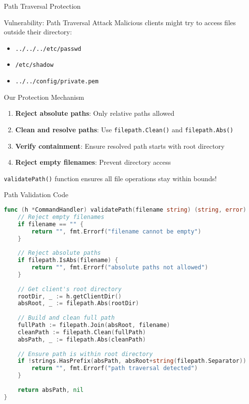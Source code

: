 \documentclass[aspectratio=169]{beamer}
\begin{document}
\begin{frame}{Path Traversal Protection}
\begin{block}{Vulnerability: Path Traversal Attack}
Malicious clients might try to access files outside their directory:
\begin{itemize}
    \item \texttt{../../../etc/passwd}
    \item \texttt{/etc/shadow}
    \item \texttt{../../config/private.pem}
\end{itemize}
\end{block}

\vspace{0.3cm}

\begin{exampleblock}{Our Protection Mechanism}
\begin{enumerate}
    \item \textbf{Reject absolute paths}: Only relative paths allowed
    \item \textbf{Clean and resolve paths}: Use \texttt{filepath.Clean()} and \texttt{filepath.Abs()}
    \item \textbf{Verify containment}: Ensure resolved path starts with root directory
    \item \textbf{Reject empty filenames}: Prevent directory access
\end{enumerate}
\end{exampleblock}

\vspace{0.2cm}
\texttt{validatePath()} function ensures all file operations stay within bounds!
\end{frame}

\begin{frame}[fragile]{Path Validation Code}
\begin{lstlisting}[language=Go, basicstyle=\ttfamily\tiny]
func (h *CommandHandler) validatePath(filename string) (string, error) {
    // Reject empty filenames
    if filename == "" {
        return "", fmt.Errorf("filename cannot be empty")
    }
    
    // Reject absolute paths
    if filepath.IsAbs(filename) {
        return "", fmt.Errorf("absolute paths not allowed")
    }
    
    // Get client's root directory
    rootDir, _ := h.getClientDir()
    absRoot, _ := filepath.Abs(rootDir)
    
    // Build and clean full path
    fullPath := filepath.Join(absRoot, filename)
    cleanPath := filepath.Clean(fullPath)
    absPath, _ := filepath.Abs(cleanPath)
    
    // Ensure path is within root directory
    if !strings.HasPrefix(absPath, absRoot+string(filepath.Separator)) {
        return "", fmt.Errorf("path traversal detected")
    }
    
    return absPath, nil
}
\end{lstlisting}
\end{frame}
\end{document}
